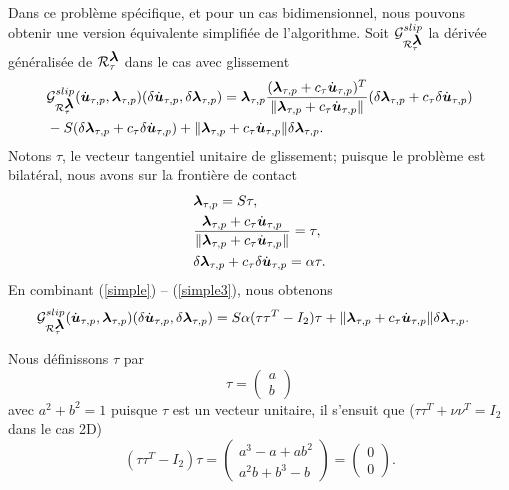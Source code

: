 Dans ce problème spécifique, et pour un cas bidimensionnel, nous pouvons obtenir une version équivalente simplifiée de l'algorithme. Soit ${\cal G}_{{\cal R}_{\tau}^{\mbox{\boldmath{$\lambda$}}}}^{slip}$ la dérivée généralisée de ${\cal R}_{\tau}^{\mbox{\boldmath{$\lambda$}}}$ dans le cas avec glissement
\begin{align}\label{simple}
&{\cal G}_{{\cal R}_{\tau}^{\mbox{\boldmath{$\lambda$}}}}^{slip}(\dot{\mbox{\boldmath{$u$}}}_{\tau, p},\mbox{\boldmath{$\lambda$}}_{\tau, p})(\delta\dot{\mbox{\boldmath{$u$}}}_{\tau, p},\delta\mbox{\boldmath{$\lambda$}}_{\tau, p})=  \mbox{\boldmath{$\lambda$}}_{\tau, p}\frac{(\mbox{\boldmath{$\lambda$}}_{\tau, p}+c_\tau \dot{\mbox{\boldmath{$u$}}}_{\tau, p})^T}{\|\mbox{\boldmath{$\lambda$}}_{\tau, p}+c_\tau \dot{\mbox{\boldmath{$u$}}}_{\tau, p}\|}(\delta\mbox{\boldmath{$\lambda$}}_{\tau, p}+c_{\tau}\delta\dot{\mbox{\boldmath{$u$}}}_{\tau, p})\\
& - S (\delta\mbox{\boldmath{$\lambda$}}_{\tau, p}+c_{\tau}\delta\dot{\mbox{\boldmath{$u$}}}_{\tau, p})+\|\mbox{\boldmath{$\lambda$}}_{\tau, p}+c_\tau \dot{\mbox{\boldmath{$u$}}}_{\tau, p}\|\delta\mbox{\boldmath{$\lambda$}}_{\tau, p}\nonumber.
\end{align}
Notons $\tau$, le vecteur tangentiel unitaire de glissement; puisque le problème est bilatéral, nous avons sur la frontière de contact
\begin{align}
&\mbox{\boldmath{$\lambda$}}_{\tau, p}=S\tau,\label{simple1}\\
&\frac{\mbox{\boldmath{$\lambda$}}_{\tau, p}+c_\tau \dot{\mbox{\boldmath{$u$}}}_{\tau, p}}{\|\mbox{\boldmath{$\lambda$}}_{\tau, p}+c_\tau \dot{\mbox{\boldmath{$u$}}}_{\tau, p}\|}=\tau,\label{simple2}\\
&\delta\mbox{\boldmath{$\lambda$}}_{\tau, p}+c_{\tau}\delta\dot{\mbox{\boldmath{$u$}}}_{\tau, p}=\alpha \tau.\label{simple3}
\end{align}
En combinant (\ref{simple}) -- (\ref{simple3}), nous obtenons
\begin{align}
&{\cal G}_{{\cal R}_{\tau}^{\mbox{\boldmath{$\lambda$}}}}^{slip}(\dot{\mbox{\boldmath{$u$}}}_{\tau, p},\mbox{\boldmath{$\lambda$}}_{\tau, p})(\delta\dot{\mbox{\boldmath{$u$}}}_{\tau, p},\delta\mbox{\boldmath{$\lambda$}}_{\tau, p})=  S\alpha(\tau\tau^T- I_2)\tau+\|\mbox{\boldmath{$\lambda$}}_{\tau, p}+c_\tau \dot{\mbox{\boldmath{$u$}}}_{\tau, p}\|\delta\mbox{\boldmath{$\lambda$}}_{\tau, p}.\nonumber
\end{align}

\noindent Nous définissons $\tau$ par
\begin{equation*}
\tau=\left(
\begin{array}{c}
a\\
b
\end{array}\right)
\end{equation*}
avec $a^2+b^2=1$ puisque $\tau$ est un vecteur unitaire, il s'ensuit que ($\tau\tau^T+\nu\nu^T = I_2 $ dans le cas 2D)
\begin{equation*}
(\tau\tau^T- I_2)\tau=\left(
\begin{array}{c}
a^3-a+ab^2\\
a^2b+b^3-b
\end{array}\right)
=\left(
\begin{array}{c}
0\\
0
\end{array}\right)
.
\end{equation*}

